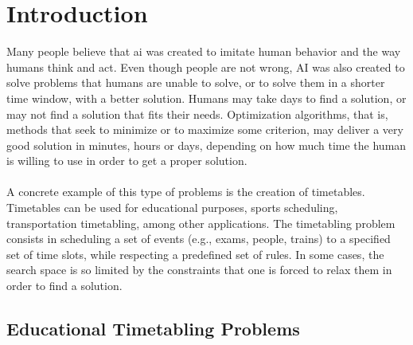 \setcounter{secnumdepth}{2}
\chapter{Introduction}
\label{introduction}
\thispagestyle{plain}

Many people believe that \gls{ai} was created to imitate human behavior and the way humans think and act. Even though people are not wrong, AI was also created to solve problems that humans are unable to solve, or to solve them in a shorter time window, with a better solution. Humans may take days to find a solution, or may not find a solution that fits their needs. Optimization algorithms, that is, methods that seek to minimize or to maximize some criterion, may deliver a very good solution in minutes, hours or days, depending on how much time the human is willing to use in order to get a proper solution.\\
\\
A concrete example of this type of problems is the creation of timetables. Timetables can be used for educational purposes, sports scheduling, transportation timetabling, among other applications. The timetabling problem consists in scheduling a set of events (e.g., exams, people, trains) to a specified set of time slots, while respecting a predefined set of rules. In some cases, the search space is so limited by the constraints that one is forced to relax them in order to find a solution. 


\section{Educational Timetabling Problems}

